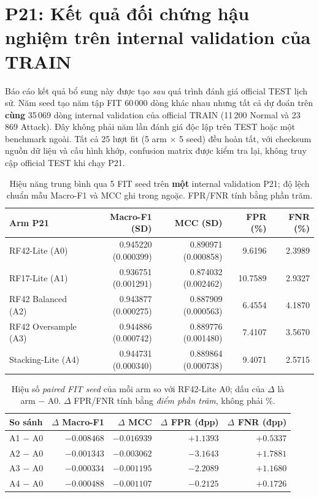 \clearpage
\section{P21: Kết quả đối chứng hậu nghiệm trên internal validation của TRAIN}
\label{sec:p21-results}
Báo cáo kết quả bổ sung này được tạo \emph{sau} quá trình đánh giá official TEST lịch sử. Năm seed tạo năm tập FIT 60\,000 dòng khác nhau nhưng tất cả dự đoán trên \textbf{cùng} 35\,069 dòng internal validation của official TRAIN (11\,200 Normal và 23\,869 Attack). Đây không phải năm lần đánh giá độc lập trên TEST hoặc một benchmark ngoài. Tất cả 25 lượt fit (5 arm $\times$ 5 seed) đều hoàn tất, với checksum nguồn dữ liệu và cấu hình khớp, confusion matrix được kiểm tra lại, không truy cập official TEST khi chạy P21.

\begin{table}[htbp]\centering
\scriptsize
\renewcommand{\arraystretch}{1.26}
\setlength{\tabcolsep}{3pt}
\caption{Hiệu năng trung bình qua 5 FIT seed trên \textbf{một} internal validation P21; độ lệch chuẩn mẫu Macro-F1 và MCC ghi trong ngoặc. FPR/FNR tính bằng phần trăm.}
\label{tab:p21-five-arm-results}
\begin{tabular}{lrrrr}
\toprule
Arm P21 & Macro-F1 (SD) & MCC (SD) & FPR (\%) & FNR (\%)\\\midrule
RF42-Lite (A0) & 0.945220 (0.000399) & 0.890971 (0.000858) & 9.6196 & 2.3989\\
RF17-Lite (A1) & 0.936751 (0.001291) & 0.874032 (0.002462) & 10.7589 & 2.9327\\
RF42 Balanced (A2) & 0.943877 (0.000275) & 0.887909 (0.000563) & 6.4554 & 4.1870\\
RF42 Oversample (A3) & 0.944886 (0.000742) & 0.889776 (0.001480) & 7.4107 & 3.5670\\
Stacking-Lite (A4) & 0.944731 (0.000340) & 0.889864 (0.000738) & 9.4071 & 2.5715\\\bottomrule
\end{tabular}
\end{table}

\begin{table}[htbp]\centering
\scriptsize
\renewcommand{\arraystretch}{1.24}
\setlength{\tabcolsep}{3pt}
\caption{Hiệu số \emph{paired FIT seed} của mỗi arm so với RF42-Lite A0; dấu của $\Delta$ là arm $-$ A0. $\Delta$ FPR/FNR tính bằng \emph{điểm phần trăm}, không phải \%.}
\label{tab:p21-paired-deltas}
\begin{tabular}{lrrrr}
\toprule
So sánh & $\Delta$ Macro-F1 & $\Delta$ MCC & $\Delta$ FPR (đpp) & $\Delta$ FNR (đpp)\\\midrule
A1 $-$ A0 & $-0.008468$ & $-0.016939$ & $+1.1393$ & $+0.5337$\\
A2 $-$ A0 & $-0.001343$ & $-0.003062$ & $-3.1643$ & $+1.7881$\\
A3 $-$ A0 & $-0.000334$ & $-0.001195$ & $-2.2089$ & $+1.1680$\\
A4 $-$ A0 & $-0.000488$ & $-0.001107$ & $-0.2125$ & $+0.1726$\\\bottomrule
\end{tabular}
\end{table}

